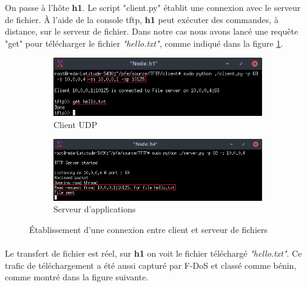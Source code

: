 On passe à l'hôte \textbf{h1}. Le script "client.py" établit une connexion avec le serveur de fichier. À l'aide de la console tftp, \textbf{h1} peut exécuter des commandes,  à distance, sur le serveur de fichier. Dans notre cas nous avons lancé une requête "get" pour télécharger le fichier \textit{"hello.txt"}, comme indiqué dans la figure \ref{fig:c/s_TFTP}.
\begin{figure}[h]
\centering
\begin{subfigure}{12.5cm}
\centering
\includegraphics[width=\textwidth]{Figures/simulation/mininet/TFTP/client/benign}
\caption{Client UDP}
\end{subfigure}
\vskip 0.4cm
\begin{subfigure}{12.5cm}
\centering
\includegraphics[width=\textwidth]{Figures/simulation/mininet/TFTP/server/benign_request}
\caption{Serveur d'applications}
\end{subfigure}
\vskip 0.3cm
\decoRule
\caption{Établissement d'une connexion entre client et serveur de fichiers}
\label{fig:c/s_TFTP}
\end{figure}
\paragraph{}
Le transfert de fichier est réel, sur \textbf{h1} on voit le fichier téléchargé \textit{"hello.txt"}. Ce trafic de téléchargement a été aussi capturé par F-DoS et classé comme bénin, comme montré dans la figure suivante.

